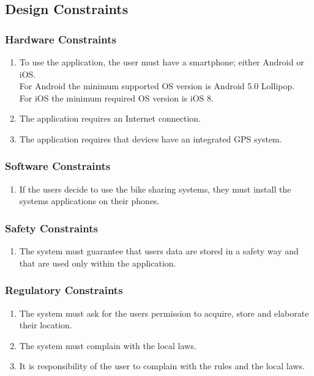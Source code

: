 \subsection{Design Constraints}
\subsubsection{Hardware Constraints}
\begin{enumerate}
\item
To use the application, the user must have a smartphone; either Android or iOS.\\
For Android the minimum supported OS version is Android 5.0 Lollipop.\\
For iOS the minimum required OS version is iOS 8.
\item
The application requires an Internet connection.
\item
The application requires that devices have an integrated GPS system.
\end{enumerate}

\subsubsection{Software Constraints}
\begin{enumerate}
\item
If the users decide to use the bike sharing systems, they must install the systems applications on their phones.
\end{enumerate}

\subsubsection{Safety Constraints}
\begin{enumerate}
\item
The system must guarantee that users data are stored in a safety way and that are used only within the application.
\end{enumerate}

\subsubsection{Regulatory Constraints}
\begin{enumerate}
\item
The system must ask for the users permission to acquire, store and elaborate their location.
\item
The system must complain with the local laws.
\item
It is responsibility of the user to complain with the rules and the local laws.
\end{enumerate}

